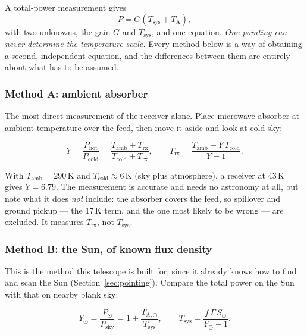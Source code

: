 \documentclass[11pt,a4paper]{article}
\begin{document}
A total-power measurement gives
\begin{equation}
P = G\left(T_\text{sys} + T_\text{A}\right),
\end{equation}
with two unknowns, the gain $G$ and $T_\text{sys}$, and one equation. \emph{One pointing can never determine the temperature scale.} Every method below is a way of obtaining a second, independent equation, and the differences between them are entirely about what has to be assumed.

\subsubsection{Method A: ambient absorber}

The most direct measurement of the receiver alone. Place microwave absorber at ambient temperature over the feed, then move it aside and look at cold sky:

\begin{equation}
Y = \frac{P_\text{hot}}{P_\text{cold}}
= \frac{T_\text{amb} + T_\text{rx}}{T_\text{cold} + T_\text{rx}},
\qquad
T_\text{rx} = \frac{T_\text{amb} - Y\,T_\text{cold}}{Y - 1}.
\end{equation}

With $T_\text{amb} = 290$\,K and $T_\text{cold} \approx 6$\,K (sky plus atmosphere), a receiver at 43\,K gives $Y = 6.79$. The measurement is accurate and needs no astronomy at all, but note what it does \emph{not} include: the absorber covers the feed, so spillover and ground pickup --- the 17\,K term, and the one most likely to be wrong --- are excluded. It measures $T_\text{rx}$, not $T_\text{sys}$.

\subsubsection{Method B: the Sun, of known flux density}

This is the method this telescope is built for, since it already knows how to find and scan the Sun (Section~\ref{sec:pointing}). Compare the total power on the Sun with that on nearby blank sky:

\begin{equation}
Y_\odot = \frac{P_\odot}{P_\text{sky}} = 1 + \frac{T_{\text{A},\odot}}{T_\text{sys}},
\qquad
T_\text{sys} = \frac{f\,\Gamma\,S_\odot}{Y_\odot - 1}.
\label{eq:suntsys}
\end{equation}
\end{document}
